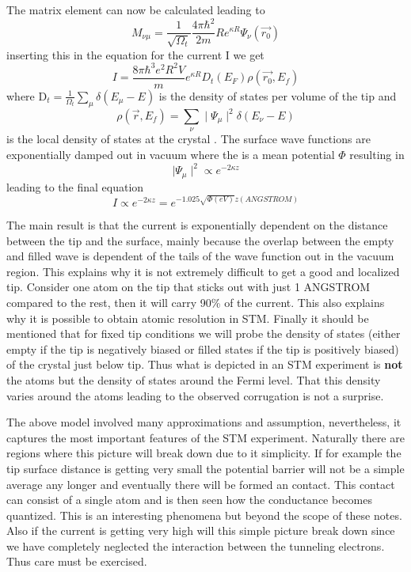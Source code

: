 The matrix element can now be calculated leading to 
\begin{equation}
M_{\nu\mu} = \frac{1}{\sqrt{\Omega_t}}\frac{4\pi \hbar^2}{2m}Re^{\kappa R}\Psi_\nu(\overrightarrow{r_0})
\end{equation}
inserting this in the equation for the current I we get
\begin{equation}
I = \frac{8\pi\hbar^3 e^2 R^2 V}{m}e^{\kappa R}D_t(E_F)\rho(\overrightarrow{r_0},E_f)
 \end{equation}
where D$_t  =  \frac{1}{\Omega_t}\sum_ {\mu} \delta(E_\mu-E)$ is the density of states per volume of the tip and
\begin{equation}
\rho(\overrightarrow{r},E_f) =\sum_{\nu} \mid\Psi_\mu \mid^2 \delta(E_\nu -E)
 \end{equation}
is the local density of states at the crystal . The surface wave functions are exponentially damped out in vacuum where the is a mean potential $\Phi$ resulting in
\begin{equation}
 \mid\Psi_\mu \mid^2  \propto e^{-2\kappa z}
 \end{equation}
leading to the final equation
\begin{equation}
 I   \propto e^{-2\kappa z} =e^{-1.025\sqrt{\Phi(eV)}z(ANGSTROM)}
 \end{equation}

The main result is that the current is exponentially dependent on the distance between the tip and the surface, mainly because the overlap between the empty and filled wave is dependent of the tails of the wave function out in the vacuum region. This explains why it is not extremely difficult to get a good and localized tip. Consider one atom on the tip that sticks out with just 1 ANGSTROM compared to the rest, then it will carry 90\% of the current. This also explains why it is possible to obtain atomic resolution in STM.
 Finally it should be mentioned that for  fixed tip conditions  we will probe the density of states (either empty if the tip is negatively biased or filled states if the tip is positively biased) of the crystal just below tip. Thus what is depicted in an STM experiment is {\bf not} the atoms but the density of states around the Fermi level. That this density varies around the atoms leading to the observed corrugation is not a surprise.

The above model involved many approximations and assumption, nevertheless, it captures the most important features of the STM experiment. Naturally there are regions where this picture will break down due to it simplicity. If for example the tip surface distance is getting very small the potential barrier will not be a simple average any longer and eventually there will be formed an contact. This contact can consist of a single atom and is then seen how the conductance becomes quantized. This is an interesting phenomena but beyond the scope of these notes. Also if the current is getting very high will this simple picture break down since we have completely neglected the interaction between the  tunneling electrons. Thus care must be exercised.



